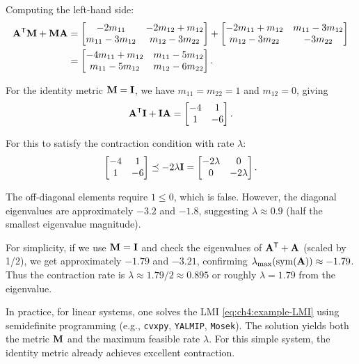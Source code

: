 Computing the left-hand side:
\begin{align}
\mathbf{A}^{\mathsf{T}}\mathbf{M} + \mathbf{M}\mathbf{A} &= \begin{bmatrix} -2m_{11} & -2m_{12} + m_{12} \\ m_{11} - 3m_{12} & m_{12} - 3m_{22} \end{bmatrix}
+ \begin{bmatrix} -2m_{11} + m_{12} & m_{11} - 3m_{12} \\ m_{12} - 3m_{22} & -3m_{22} \end{bmatrix} \\
&= \begin{bmatrix} -4m_{11} + m_{12} & m_{11} - 5m_{12} \\ m_{11} - 5m_{12} & m_{12} - 6m_{22} \end{bmatrix}.
\end{align}

For the identity metric $\mathbf{M} = \mathbf{I}$, we have $m_{11}=m_{22}=1$ and $m_{12}=0$,
giving
\begin{equation}
\mathbf{A}^{\mathsf{T}}\mathbf{I} + \mathbf{I}\mathbf{A} = \begin{bmatrix} -4 & 1 \\ 1 & -6 \end{bmatrix}.
\end{equation}

For this to satisfy the contraction condition with rate $\lambda$:
\begin{equation}
\begin{bmatrix} -4 & 1 \\ 1 & -6 \end{bmatrix} \preceq -2\lambda \mathbf{I} = \begin{bmatrix} -2\lambda & 0 \\ 0 & -2\lambda \end{bmatrix}.
\end{equation}

The off-diagonal elements require $1 \leq 0$, which is false. However, the diagonal
eigenvalues are approximately $-3.2$ and $-1.8$, suggesting $\lambda \approx 0.9$
(half the smallest eigenvalue magnitude).

For simplicity, if we use $\mathbf{M}=\mathbf{I}$ and check the eigenvalues of $\mathbf{A}^{\mathsf{T}} + \mathbf{A}$
(scaled by 1/2), we get approximately $-1.79$ and $-3.21$, confirming $\lambda_{\max}(\operatorname{sym}(\mathbf{A})) \approx -1.79$.
Thus the contraction rate is $\lambda \approx 1.79 / 2 \approx 0.895$ or roughly $\lambda = 1.79$ from the eigenvalue.

\begin{designbox}
In practice, for linear systems, one solves the LMI \eqref{eq:ch4:example-LMI} using
semidefinite programming (e.g., \texttt{cvxpy}, \texttt{YALMIP}, \texttt{Mosek}). The
solution yields both the metric $\mathbf{M}$ and the maximum feasible rate $\lambda$. For
this simple system, the identity metric already achieves excellent contraction.
\end{designbox}


